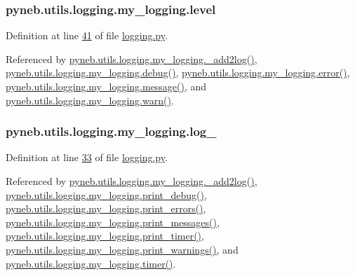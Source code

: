 \hypertarget{classpyneb_1_1utils_1_1logging_1_1my__logging_aa70215328c3f7a97a607c584026e144a}{}
\subsubsection[{level}]{\setlength{\rightskip}{0pt plus 5cm}pyneb.\+utils.\+logging.\+my\+\_\+logging.\+level}\label{classpyneb_1_1utils_1_1logging_1_1my__logging_aa70215328c3f7a97a607c584026e144a}


Definition at line \hyperlink{logging_8py_source_l00041}{41} of file \hyperlink{logging_8py_source}{logging.\+py}.



Referenced by \hyperlink{logging_8py_source_l00059}{pyneb.\+utils.\+logging.\+my\+\_\+logging.\+\_\+add2log()}, \hyperlink{logging_8py_source_l00069}{pyneb.\+utils.\+logging.\+my\+\_\+logging.\+debug()}, \hyperlink{logging_8py_source_l00099}{pyneb.\+utils.\+logging.\+my\+\_\+logging.\+error()}, \hyperlink{logging_8py_source_l00079}{pyneb.\+utils.\+logging.\+my\+\_\+logging.\+message()}, and \hyperlink{logging_8py_source_l00089}{pyneb.\+utils.\+logging.\+my\+\_\+logging.\+warn()}.

\hypertarget{classpyneb_1_1utils_1_1logging_1_1my__logging_a4bda17b594629b5490207080dbcb3bbd}{}
\subsubsection[{log\+\_\+}]{\setlength{\rightskip}{0pt plus 5cm}pyneb.\+utils.\+logging.\+my\+\_\+logging.\+log\+\_\+}\label{classpyneb_1_1utils_1_1logging_1_1my__logging_a4bda17b594629b5490207080dbcb3bbd}


Definition at line \hyperlink{logging_8py_source_l00033}{33} of file \hyperlink{logging_8py_source}{logging.\+py}.



Referenced by \hyperlink{logging_8py_source_l00059}{pyneb.\+utils.\+logging.\+my\+\_\+logging.\+\_\+add2log()}, \hyperlink{logging_8py_source_l00157}{pyneb.\+utils.\+logging.\+my\+\_\+logging.\+print\+\_\+debug()}, \hyperlink{logging_8py_source_l00149}{pyneb.\+utils.\+logging.\+my\+\_\+logging.\+print\+\_\+errors()}, \hyperlink{logging_8py_source_l00133}{pyneb.\+utils.\+logging.\+my\+\_\+logging.\+print\+\_\+messages()}, \hyperlink{logging_8py_source_l00165}{pyneb.\+utils.\+logging.\+my\+\_\+logging.\+print\+\_\+timer()}, \hyperlink{logging_8py_source_l00141}{pyneb.\+utils.\+logging.\+my\+\_\+logging.\+print\+\_\+warnings()}, and \hyperlink{logging_8py_source_l00115}{pyneb.\+utils.\+logging.\+my\+\_\+logging.\+timer()}.

